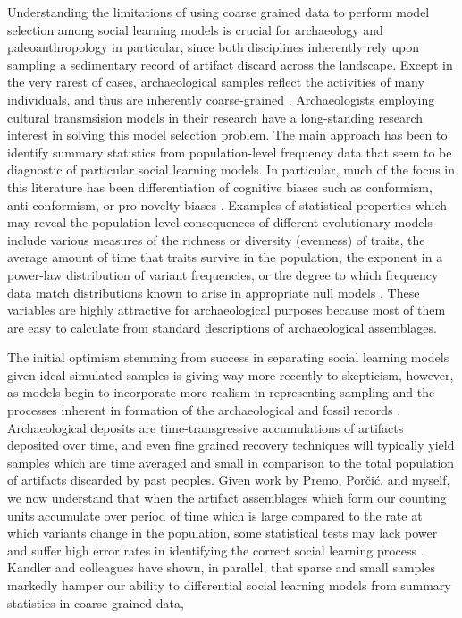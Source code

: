 \documentclass[10pt,letterpaper]{article}
\begin{document}
Understanding the limitations of using coarse grained data to perform model selection among social learning models is crucial for archaeology and paleoanthropology in particular, since both disciplines inherently rely upon sampling a sedimentary record of artifact discard across the landscape.  Except in the very rarest of cases, archaeological samples reflect the activities of many individuals, and thus are inherently coarse-grained \cite{Shennan2011}.  Archaeologists employing cultural transmsision models in their research have a long-standing research interest in solving this model selection problem.  The main approach has been to identify summary statistics from population-level frequency data that seem to be diagnostic of particular social learning models.  In particular, much of the focus in this literature has been differentiation of cognitive biases such as conformism, anti-conformism, or pro-novelty biases \cite{Bentley2003,bentley2004random,bentley2007regular,Blythe2011space,Crema:2014ef,Evans:2011vm,kandler2013non,kohler2004,Mesoudi2009,Rorabaugh:2014fl,steele2010ceramic}.   Examples of statistical properties which may reveal the population-level consequences of different evolutionary models include various measures of the richness or diversity (evenness) of traits, the average amount of time that traits survive in the population, the exponent in a power-law distribution of variant frequencies, or the degree to which frequency data match distributions known to arise in appropriate null models \cite{Mesoudi2009}.  These variables are highly attractive for archaeological purposes because most of them are easy to calculate from standard descriptions of archaeological assemblages.  

The initial optimism stemming from success in separating social learning models given ideal simulated samples is giving way more recently to skepticism, however, as models begin to incorporate more realism in representing sampling and the processes inherent in formation of the archaeological and fossil records \cite{Kandler20150905,Madsen2012TA,wilderkandler2015}.  Archaeological deposits are time-transgressive accumulations of artifacts deposited over time, and even fine grained recovery techniques will typically yield samples which are time averaged and small in comparison to the total population of artifacts discarded by past peoples.   Given work by Premo, Porčić, and myself, we now understand that when the artifact assemblages which form our counting units accumulate over period of time which is large compared to the rate at which variants change in the population, some statistical tests may lack power and suffer high error rates in identifying the correct social learning process \cite{Madsen2012TA,Porcic2014Exploring-the-E,Premo:2014jv}.  Kandler and colleagues have shown, in parallel, that sparse and small samples markedly hamper our ability to differential social learning models from summary statistics in coarse grained data, 
\end{document}
